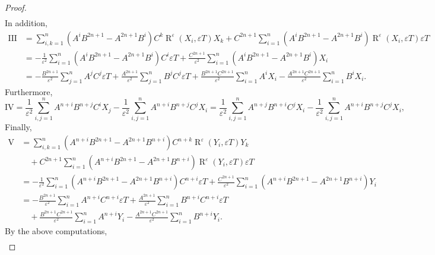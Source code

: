 \documentclass[11pt]{amsart}
\newcommand{\eps}{\varepsilon}
\DeclareMathOperator{\R}{R}
\theoremstyle{definition}
\theoremstyle{remark}
\numberwithin{equation}{section}
\begin{document}
\begin{proof}
\begin{equation*}
\begin{split}
        \end{split}
    \end{equation*}
    In addition,
    \begin{equation*}
        \begin{split}
            \mathrm{III}&=\sum_{i,k=1}^n\left(A^iB^{2n+1}-A^{2n+1}B^i\right)C^k \R^\eps (X_i,\eps T)X_k+C^{2n+1}\sum_{i=1}^n\left(A^iB^{2n+1}-A^{2n+1}B^i\right) \R^\eps (X_i,\eps T)\eps T\\
            &=-\frac{1}{\eps^2}\sum_{i=1}^n\left(A^iB^{2n+1}-A^{2n+1}B^i\right)C^i\eps T+\frac{C^{2n+1}}{\eps^2}\sum_{i=1}^n\left(A^iB^{2n+1}-A^{2n+1}B^i\right)X_i\\
            &=-\frac{B^{2n+1}}{\eps^2}\sum_{j=1}^nA^jC^j\eps T+\frac{A^{2n+1}}{\eps^2}\sum_{j=1}^nB^jC^j\eps T+\frac{B^{2n+1}C^{2n+1}}{\eps^2}\sum_{i=1}^nA^iX_i-\frac{A^{2n+1}C^{2n+1}}{\eps^2}\sum_{i=1}^nB^iX_i.
        \end{split}
    \end{equation*}
    Furthermore,
    \begin{equation*}
        \mathrm{IV}=\frac{1}{\eps^2}\sum_{i,j=1}^nA^{n+i}B^{n+j}C^iX_j-\frac{1}{\eps^2}\sum_{i,j=1}^nA^{n+i}B^{n+j}C^jX_i=\frac{1}{\eps^2}\sum_{i,j=1}^nA^{n+j}B^{n+i}C^jX_i-\frac{1}{\eps^2}\sum_{i,j=1}^nA^{n+i}B^{n+j}C^jX_i,
    \end{equation*}
    Finally,
    \begin{equation*}
        \begin{split}
            \mathrm{V}&=\sum_{i,k=1}^n\left(A^{n+i}B^{2n+1}-A^{2n+1}B^{n+i}\right)C^{n+k} \R^\eps (Y_i,\eps T)Y_k\\
            &\quad+C^{2n+1}\sum_{i=1}^n\left(A^{n+i}B^{2n+1}-A^{2n+1}B^{n+i}\right) \R^\eps (Y_i,\eps T)\eps T\\
            &=-\frac{1}{\eps^2}\sum_{i=1}^n\left(A^{n+i}B^{2n+1}-A^{2n+1}B^{n+i}\right)C^{n+i}\eps T+\frac{C^{2n+1}}{\eps^2}\sum_{i=1}^n\left(A^{n+i}B^{2n+1}-A^{2n+1}B^{n+i}\right)Y_i\\
            &=-\frac{B^{2n+1}}{\eps^2}\sum_{i=1}^nA^{n+i}C^{n+i}\eps T+\frac{A^{2n+1}}{\eps^2}\sum_{i=1}^nB^{n+i}C^{n+i}\eps T\\
            &\quad+\frac{B^{2n+1}C^{2n+1}}{\eps^2}\sum_{i=1}^nA^{n+i}Y_i-\frac{A^{2n+1}C^{2n+1}}{\eps^2}\sum_{i=1}^nB^{n+i}Y_i.
        \end{split}
    \end{equation*}
    By the above computations,
    \begin{equation*}
\begin{split}

\end{split}
\end{equation*}
\end{proof}
\end{document}
